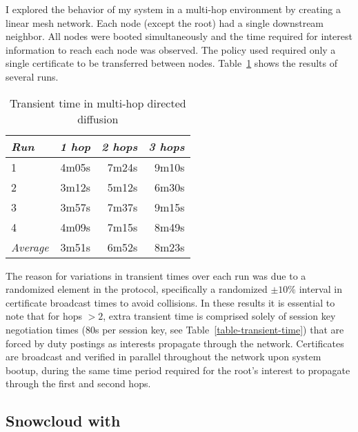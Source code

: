 I explored the behavior of my system in a multi-hop environment by creating a linear mesh
network. Each node (except the root) had a single downstream neighbor. All nodes were booted
simultaneously and the time required for interest information to reach each node was observed.
The policy used required only a single certificate to be transferred between nodes.
Table~\ref{table-multi-hop-transient} shows the results of several runs.

\begin{table}[tbhp]
  \newcommand\T{\rule{0pt}{2.1ex}}
  \centering
  \caption{Transient time in multi-hop directed diffusion}
  {
  \begin{tabular}{|l|r|r|r|} \hline
    \textit{Run} \T & \textit{1 hop }
                    & \textit{2 hops}
                    & \textit{3 hops} \\ \hline \hline

                   1 \T &  4m05s & 7m24s & 9m10s \\ \hline
                   2 \T &  3m12s & 5m12s & 6m30s \\ \hline
                   3 \T &  3m57s & 7m37s & 9m15s \\ \hline
                   4 \T &  4m09s & 7m15s & 8m49s \\ \hline
    \textit{Average} \T &  3m51s & 6m52s & 8m23s \\ \hline
  \end{tabular}
  }
  \label{table-multi-hop-transient}
\end{table}

The reason for variations in transient times over each run was due to a randomized element in
the protocol, specifically a randomized $\pm 10\%$ interval in certificate broadcast times to
avoid collisions. In these results it is essential to note that for hops $> 2$, extra transient
time is comprised solely of session key negotiation times (80s per session key, see
Table~\ref{table-transient-time}) that are forced by duty postings as interests propagate
through the network. Certificates are broadcast and verified in parallel throughout the network
upon system bootup, during the same time period required for the root's interest to propagate
through the first and second hops.

\subsection{Snowcloud with \Sprocket}
\label{section-snowcloud-sprocket}

